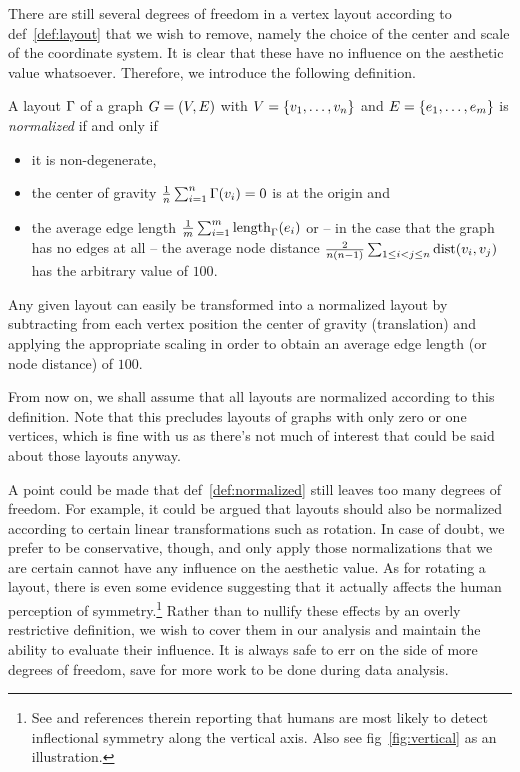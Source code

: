 \documentclass{graphstudy}
\begin{document}
There are still several degrees of freedom in a vertex layout according to \acl{def}~\ref{def:layout} that we wish to
remove, namely the choice of the center and scale of the coordinate system.  It is clear that these have no influence on
the aesthetic value whatsoever.  Therefore, we introduce the following definition.

\begin{definition}
  A layout \(\Gamma\) of a graph \(G=(V,E)\) with \(V=\{v_1,\ldots,v_n\}\) and
  \(E=\{e_1,\ldots,e_m\}\) is \emph{normalized} if and only if
  \begin{itemize}
  \item it is non-degenerate,
  \item the center of gravity \(\frac{1}{n}\sum_{i=1}^{n}\Gamma(v_i)=0\) is at the origin and
  \item the average edge length \(\frac{1}{m}\sum_{i=1}^{m}\operatorname{length}_\Gamma(e_i)\) or -- in the case that the graph has
    no edges at all -- the average node distance \(\frac{2}{n(n-1)}\sum_{1\leq{}i<j\leq{}n}\operatorname{dist}(v_i,v_j)\) has the
    arbitrary value of \(100\).
  \end{itemize}
  \label{def:normalized}
\end{definition}

Any given layout can easily be transformed into a normalized layout by subtracting from each vertex position the center
of gravity (translation) and applying the appropriate scaling in order to obtain an average edge length (or node
distance) of \(100\).

From now on, we shall assume that all layouts are normalized according to this definition.  Note that this precludes
layouts of graphs with only zero or one vertices, which is fine with us as there's not much of interest that could be
said about those layouts anyway.

A point could be made that \acl{def}~\ref{def:normalized} still leaves too many degrees of freedom.  For example, it
could be argued that layouts should also be normalized according to certain linear transformations such as rotation.  In
case of doubt, we prefer to be conservative, though, and only apply those normalizations that we are certain cannot have
any influence on the aesthetic value.  As for rotating a layout, there is even some evidence suggesting that it actually
affects the human perception of symmetry.\footnote{%
  See \textcite{Giannouli2013} and references therein reporting that humans are most likely to detect inflectional
  symmetry along the vertical axis.  Also see \acl{fig}~\ref{fig:vertical} as an illustration.
}
Rather than to nullify these effects by an overly restrictive definition, we wish to cover them in our analysis and
maintain the ability to evaluate their influence.  It is always safe to err on the side of more degrees of freedom, save
for more work to be done during data analysis.
\end{document}
